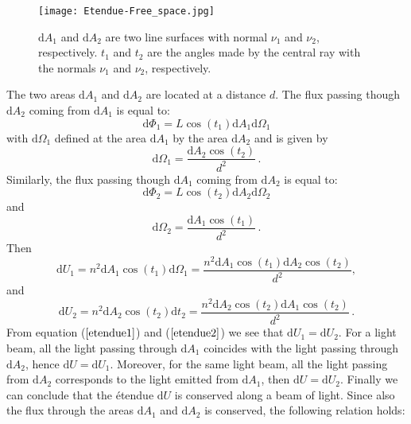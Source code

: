 \begin{figure}[htbp]
 \label{fig:etendue_conservation}
     \begin{center}
     \texttt{[image: Etendue-Free\_space.jpg]}
     \end{center}
     \caption{\footnotesize{$\textrm{d}A_1$ and $\textrm{d}A_2$ are two line surfaces with normal $\nu_1$ and $\nu_2$, respectively. $t_1$ and $t_2$ are the angles made by the central ray with the normals $\nu_1$ and $\nu_2$, respectively.}}
\label{fig:etendue_conservation}
 \end{figure}
The two areas $\textrm{d}A_1$ and $\textrm{d}A_2$ are located at a distance $d$. The flux passing though $\textrm{d}A_2$ coming from $\textrm{d}A_1$ is equal to:
\begin{equation}
\textrm{d}\Phi_1 = L \cos(t_1) \textrm{d}A_1 \textrm{d}\Omega_1
\end{equation}
with $\textrm{d}\Omega_1$ defined at the area $\textrm{d}A_1$ by the area $\textrm{d}A_2$ and is given by 
\begin{equation}
\textrm{d}\Omega_1 = \frac{\textrm{d}A_2\cos(t_2)}{d^2}\,.
\end{equation}
Similarly, the flux passing though $\textrm{d}A_1$ coming from $\textrm{d}A_2$ is equal to:
\begin{equation}
\textrm{d}\Phi_2 = L \cos(t_2) \textrm{d}A_2 \textrm{d}\Omega_2
\end{equation}
and
\begin{equation}
\textrm{d}\Omega_2 = \frac{\textrm{d}A_1\cos(t_1)}{d^2}\,.
\end{equation}
Then \begin{equation}
\label{etendue1}
\textrm{d}U_1 = n^2 \textrm{d}A_1\cos(t_1)\textrm{d}\Omega_1= \frac{n^2 \textrm{d}A_1\cos(t_1)\textrm{d}A_2\cos(t_2)}{d^2},
\end{equation}
and
\begin{equation}
\label{etendue2}
\textrm{d}U_2 = n^2 \textrm{d}A_2\cos(t_2)\textrm{d}t_2= \frac{ n^2 \textrm{d}A_2\cos(t_2)\textrm{d}A_1\cos(t_2)}{d^2}\,.
\end{equation}
From equation ($\ref{etendue1}$) and ($\ref{etendue2}$) we see that $\textrm{d}U_1=\textrm{d}U_2$.
For a light beam, all the light passing through $\textrm{d}A_1$ coincides with the light passing through $\textrm{d}A_2$, hence $\textrm{d}U = \textrm{d}U_1$. Moreover, for the same light beam, all the light passing from $\textrm{d}A_2$ corresponds to the light emitted from $\textrm{d}A_1$, then $\textrm{d}U=\textrm{d}U_2$. Finally we can conclude that the \'{e}tendue $\textrm{d}U$ is conserved along a beam of light. Since also the flux through the areas $\textrm{d}A_1$ and $\textrm{d}A_2$ is conserved, the following relation holds:
